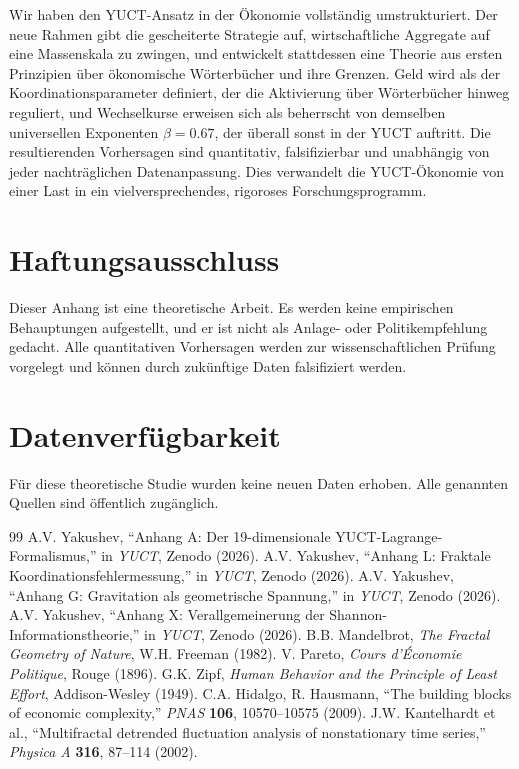 \documentclass[12pt,a4paper]{article}
\theoremstyle{remark}
\begin{document}
	Wir haben den YUCT-Ansatz in der Ökonomie vollständig umstrukturiert. Der neue Rahmen gibt die gescheiterte Strategie auf, wirtschaftliche Aggregate auf eine Massenskala zu zwingen, und entwickelt stattdessen eine Theorie aus ersten Prinzipien über ökonomische Wörterbücher und ihre Grenzen. Geld wird als der Koordinationsparameter definiert, der die Aktivierung über Wörterbücher hinweg reguliert, und Wechselkurse erweisen sich als beherrscht von demselben universellen Exponenten \(\beta = 0.67\), der überall sonst in der YUCT auftritt. Die resultierenden Vorhersagen sind quantitativ, falsifizierbar und unabhängig von jeder nachträglichen Datenanpassung. Dies verwandelt die YUCT-Ökonomie von einer Last in ein vielversprechendes, rigoroses Forschungsprogramm.
	
	\section*{Haftungsausschluss}
	
	Dieser Anhang ist eine theoretische Arbeit. Es werden keine empirischen Behauptungen aufgestellt, und er ist nicht als Anlage- oder Politikempfehlung gedacht. Alle quantitativen Vorhersagen werden zur wissenschaftlichen Prüfung vorgelegt und können durch zukünftige Daten falsifiziert werden.
	
	\section*{Datenverfügbarkeit}
	
	Für diese theoretische Studie wurden keine neuen Daten erhoben. Alle genannten Quellen sind öffentlich zugänglich.
	
	\begin{thebibliography}{99}
		 A.V. Yakushev, ``Anhang A: Der 19-dimensionale YUCT-Lagrange-Formalismus,'' in \emph{YUCT}, Zenodo (2026).
		 A.V. Yakushev, ``Anhang L: Fraktale Koordinationsfehlermessung,'' in \emph{YUCT}, Zenodo (2026).
		 A.V. Yakushev, ``Anhang G: Gravitation als geometrische Spannung,'' in \emph{YUCT}, Zenodo (2026).
		 A.V. Yakushev, ``Anhang X: Verallgemeinerung der Shannon-Informationstheorie,'' in \emph{YUCT}, Zenodo (2026).
		 B.B. Mandelbrot, \emph{The Fractal Geometry of Nature}, W.H. Freeman (1982).
		 V. Pareto, \emph{Cours d'Économie Politique}, Rouge (1896).
		 G.K. Zipf, \emph{Human Behavior and the Principle of Least Effort}, Addison-Wesley (1949).
		 C.A. Hidalgo, R. Hausmann, ``The building blocks of economic complexity,'' \emph{PNAS} \textbf{106}, 10570–10575 (2009).
		 J.W. Kantelhardt et al., ``Multifractal detrended fluctuation analysis of nonstationary time series,'' \emph{Physica A} \textbf{316}, 87–114 (2002).
	\end{thebibliography}
	
\end{document}
